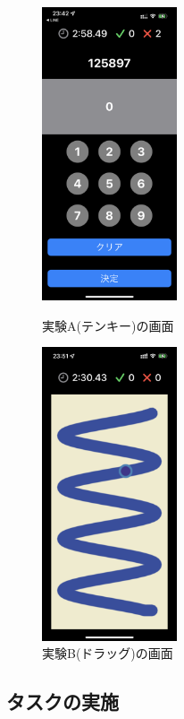 \begin{figure}[htbp]
  \begin{minipage}{0.5\hsize}
    \begin{center}
       \includegraphics[width=40mm]{img/new1.png}
    \end{center}
    \caption{実験A(テンキー)の画面}
    \label{fig:tenkey}
  \end{minipage}
  \begin{minipage}{0.5\hsize}
    \begin{center}
       \includegraphics[width=40mm]{img/new2.png}
    \end{center}
    \caption{実験B(ドラッグ)の画面}
    \label{fig:drag}
  \end{minipage}
\end{figure}

\subsection{タスクの実施}


